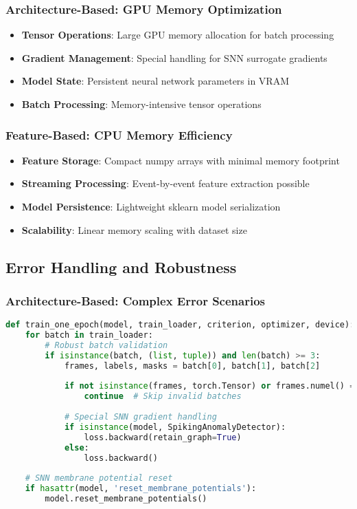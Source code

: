 \documentclass[11pt,a4paper]{article}
\begin{document}
\subsubsection{Architecture-Based: GPU Memory Optimization}
\begin{itemize}
    \item \textbf{Tensor Operations}: Large GPU memory allocation for batch processing
    \item \textbf{Gradient Management}: Special handling for SNN surrogate gradients
    \item \textbf{Model State}: Persistent neural network parameters in VRAM
    \item \textbf{Batch Processing}: Memory-intensive tensor operations
\end{itemize}

\subsubsection{Feature-Based: CPU Memory Efficiency}
\begin{itemize}
    \item \textbf{Feature Storage}: Compact numpy arrays with minimal memory footprint
    \item \textbf{Streaming Processing}: Event-by-event feature extraction possible
    \item \textbf{Model Persistence}: Lightweight sklearn model serialization
    \item \textbf{Scalability}: Linear memory scaling with dataset size
\end{itemize}

\subsection{Error Handling and Robustness}

\subsubsection{Architecture-Based: Complex Error Scenarios}
\begin{lstlisting}[language=Python, caption=Architecture-Based Error Handling]
def train_one_epoch(model, train_loader, criterion, optimizer, device):
    for batch in train_loader:
        # Robust batch validation
        if isinstance(batch, (list, tuple)) and len(batch) >= 3:
            frames, labels, masks = batch[0], batch[1], batch[2]
            
            if not isinstance(frames, torch.Tensor) or frames.numel() == 0:
                continue  # Skip invalid batches
            
            # Special SNN gradient handling
            if isinstance(model, SpikingAnomalyDetector):
                loss.backward(retain_graph=True)
            else:
                loss.backward()
    
    # SNN membrane potential reset
    if hasattr(model, 'reset_membrane_potentials'):
        model.reset_membrane_potentials()
\end{lstlisting}
\end{document}
